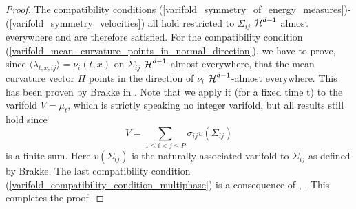 \begin{proof}
	The compatibility conditions 
	(\ref{varifold_symmetry_of_energy_measures})-(\ref{varifold_symmetry_velocities})
	all hold restricted to $ \Sigma_{ i j } $ $ \operatorname{\mathcal{H}}^{ d - 1 } $ almost 
	everywhere and are therefore satisfied.
	For the compatibility condition 
	(\ref{varifold_mean_curvature_points_in_normal_direction}), we have to 
	prove, since $ \langle \lambda_{ t , x , i j } \rangle = \nu_{ i } ( t , 
	x ) $ on $ \Sigma_{ i j } $ $ \operatorname{\mathcal{H}}^{ d- 1 } $-almost everywhere, that the 
	mean curvature vector $ H $ points in the direction of $ \nu_{ i } $ $ 
	\operatorname{\mathcal{H}}^{ d - 1 } $-almost everywhere. This has been proven by Brakke in 
	\cite[Thm.~5.8]{brakke_kenneth_motion_of_surface_by_mean_curvature}. Note 
	that we apply it (for a fixed time t) to the varifold $ V = \mu_{ t } $, 
	which is strictly speaking no integer varifold, but all results still hold 
	since 
	\begin{equation*}
		V = 
		\sum_{ 1 \leq i < j \leq P }
		\sigma_{ i j }
		v ( \Sigma_{ i j } )
	\end{equation*}
	is a finite sum. Here $ v ( \Sigma_{ i j } ) $ is the naturally associated 
	varifold to $ \Sigma_{ i j } $ as defined by Brakke.
	The last compatibility condition 
	(\ref{varifold_compatibility_condition_multiphase}) is a consequence of 
	,
	. 
	This completes the proof.
\end{proof}

